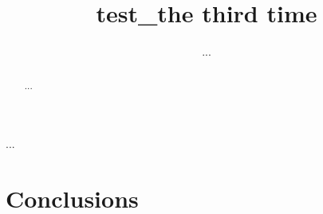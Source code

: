 \documentclass[journal, 10pt]{IEEEtran}
\title{test_the third time}
\author{...}
\begin{document}
\maketitle


\begin{abstract}

...

\end{abstract}

\begin{IEEEkeywords}

...

\end{IEEEkeywords}














\section{Conclusions}




%

%
\end{document}
